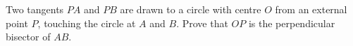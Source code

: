 Two tangents $PA$ and $PB$ are drawn to a circle with centre $O$ from an external point $P$, touching the circle at $A$ and $B$. Prove that $OP$ is the perpendicular bisector of $AB$.
